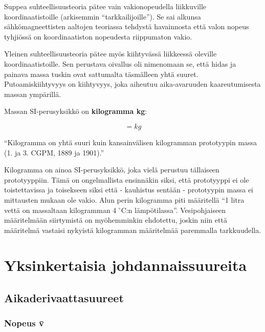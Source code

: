 \documentclass[12pt,a4paper,finnish]{book}
\begin{document}

Suppea suhteellisuusteoria pätee vain vakionopeudella liikkuville koordinaatistoille (arkisemmin ``tarkkailijoille''). 
Se sai alkunsa sähkömagneettisten aaltojen teoriassa tehdystä havainnosta että valon nopeus tyhjiössä on 
koordinaatiston nopeudesta riippumaton vakio.

Yleinen suhteellisuusteoria pätee myös kiihtyvässä liikkeessä oleville koordinaatistoille. Sen perustava oivallus 
oli nimenomaan se, että hidas ja painava massa tuskin ovat sattumalta täsmälleen yhtä suuret. Putoamiskiihtyvyys 
on kiihtyvyys, joka aiheutuu aika-avaruuden kaareutumisesta massan ympärillä.

Massan SI-perusyksikkö on \textbf{kilogramma kg}:

\begin{equation}
 [m] = kg
\end{equation}

``Kilogramma on yhtä suuri kuin kansainvälisen kilogramman prototyypin massa (1. ja 3. CGPM, 1889 ja 1901).''

Kilogramma on ainoa SI-perusyksikkö, joka vielä perustuu tällaiseen prototyyppiin. Tämä on ongelmallista ensinnäkin 
siksi, että prototyyppi ei ole toistettavissa ja toisekseen siksi että - kauhistus sentään - prototyypin massa 
ei mittausten mukaan ole vakio. Alun perin kilogramma piti määritellä ``1 litra vettä on massaltaan kilogramman 
4 $^{\circ}$C:n lämpötilassa''. Vesipohjaiseen määritelmään siirtymistä on myöhemminkin ehdotettu, joskin niin että 
määritelmä vastaisi nykyistä kilogramman määritelmää paremmalla tarkkuudella.

\chapter{Yksinkertaisia johdannaissuureita} %

\section{Aikaderivaattasuureet} %



\subsection{Nopeus \={v}}
\end{document}
